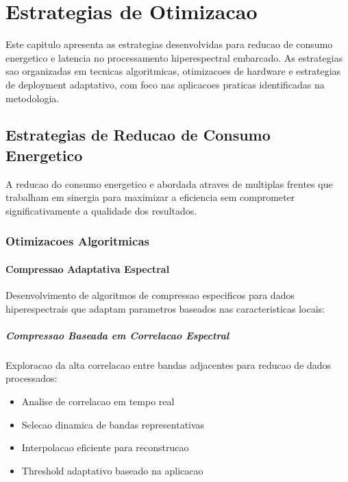 \chapter{Estrategias de Otimizacao}\label{chp:estrategias}

Este capitulo apresenta as estrategias desenvolvidas para reducao de consumo energetico e latencia no processamento hiperespectral embarcado. As estrategias sao organizadas em tecnicas algoritmicas, otimizacoes de hardware e estrategias de deployment adaptativo, com foco nas aplicacoes praticas identificadas na metodologia.

\section{Estrategias de Reducao de Consumo Energetico}\label{sec:reducao_consumo_estrategias}

A reducao do consumo energetico e abordada atraves de multiplas frentes que trabalham em sinergia para maximizar a eficiencia sem comprometer significativamente a qualidade dos resultados.

\subsection{Otimizacoes Algoritmicas}

\subsubsection{Compressao Adaptativa Espectral}
Desenvolvimento de algoritmos de compressao especificos para dados hiperespectrais que adaptam parametros baseados nas caracteristicas locais:

\paragraph{Compressao Baseada em Correlacao Espectral}
Exploracao da alta correlacao entre bandas adjacentes para reducao de dados processados:
\begin{itemize}
    \item Analise de correlacao em tempo real
    \item Selecao dinamica de bandas representativas
    \item Interpolacao eficiente para reconstrucao
    \item Threshold adaptativo baseado na aplicacao
\end{itemize}

